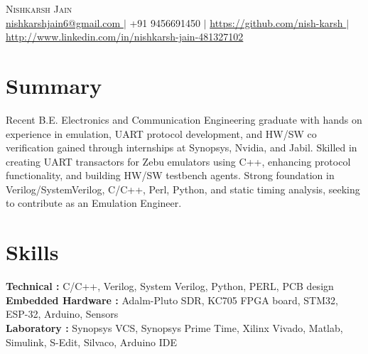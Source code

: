 \documentclass[letterpaper,11pt]{article}
\begin{document}
\begin{center}
    {\Huge \scshape Nishkarsh Jain} \\ \vspace{4pt}
    \small
\href{mailto:nishkarshjain6@gmail.com}{ nishkarshjain6@gmail.com } $|$ +91 9456691450 $|$ \href{ https://github.com/nish-karsh }{ https://github.com/nish-karsh } $|$ \href{ http://www.linkedin.com/in/nishkarsh-jain-481327102 }{ http://www.linkedin.com/in/nishkarsh-jain-481327102 }\end{center}

\section{Summary}
\small{ Recent B.E. Electronics and Communication Engineering graduate with hands on experience in emulation, UART protocol development, and HW/SW co verification gained through internships at Synopsys, Nvidia, and Jabil. Skilled in creating UART transactors for Zebu emulators using C++, enhancing protocol functionality, and building HW/SW testbench agents. Strong foundation in Verilog/SystemVerilog, C/C++, Perl, Python, and static timing analysis, seeking to contribute as an Emulation Engineer. }

\section{Skills}
\begin{itemize}[leftmargin=0.15in, label={}]
  \small{\item{
    \textbf{ Technical :} C/C++, Verilog, System Verilog, Python, PERL, PCB design \\
    \textbf{ Embedded Hardware :} Adalm-Pluto SDR, KC705 FPGA board, STM32, ESP-32, Arduino, Sensors \\
    \textbf{ Laboratory :} Synopsys VCS, Synopsys Prime Time, Xilinx Vivado, Matlab, Simulink, S-Edit, Silvaco, Arduino IDE \\
  }}
\end{itemize}
\end{document}
